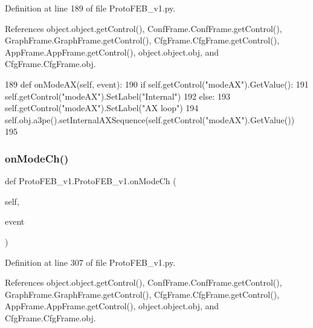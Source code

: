 Definition at line 189 of file Proto\+F\+E\+B\+\_\+v1.\+py.



References object.\+object.\+get\+Control(), Conf\+Frame.\+Conf\+Frame.\+get\+Control(), Graph\+Frame.\+Graph\+Frame.\+get\+Control(), Cfg\+Frame.\+Cfg\+Frame.\+get\+Control(), App\+Frame.\+App\+Frame.\+get\+Control(), object.\+object.\+obj, and Cfg\+Frame.\+Cfg\+Frame.\+obj.


\begin{DoxyCode}
189     \textcolor{keyword}{def }onModeAX(self, event):
190         \textcolor{keywordflow}{if} self.getControl(\textcolor{stringliteral}{"modeAX"}).GetValue():
191             self.getControl(\textcolor{stringliteral}{"modeAX"}).SetLabel(\textcolor{stringliteral}{"Internal"})
192         \textcolor{keywordflow}{else}:
193             self.getControl(\textcolor{stringliteral}{"modeAX"}).SetLabel(\textcolor{stringliteral}{"AX loop"})
194         self.obj.a3pe().setInternalAXSequence(self.getControl(\textcolor{stringliteral}{"modeAX"}).GetValue())
195 
\end{DoxyCode}
\mbox{\label{classProtoFEB__v1_1_1ProtoFEB__v1_aa3700cfa620c058e18e6da7ca2e270c1}} 
\subsubsection{\texorpdfstring{on\+Mode\+Ch()}{onModeCh()}}
{\footnotesize\ttfamily def Proto\+F\+E\+B\+\_\+v1.\+Proto\+F\+E\+B\+\_\+v1.\+on\+Mode\+Ch (\begin{DoxyParamCaption}\item[{}]{self,  }\item[{}]{event }\end{DoxyParamCaption})}



Definition at line 307 of file Proto\+F\+E\+B\+\_\+v1.\+py.



References object.\+object.\+get\+Control(), Conf\+Frame.\+Conf\+Frame.\+get\+Control(), Graph\+Frame.\+Graph\+Frame.\+get\+Control(), Cfg\+Frame.\+Cfg\+Frame.\+get\+Control(), App\+Frame.\+App\+Frame.\+get\+Control(), object.\+object.\+obj, and Cfg\+Frame.\+Cfg\+Frame.\+obj.


